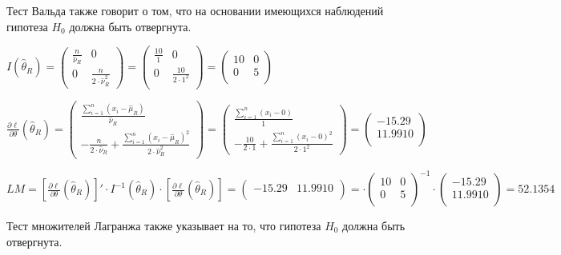\begin{problem}
\begin{sol}
Тест Вальда также говорит о том, что на основании имеющихся наблюдений гипотеза $H_0$ должна быть отвергнута.

$I(\hat{\theta}_{R}) = \begin{pmatrix}
\frac{n}{\hat{\nu}_{R}} & 0 \\
0 & \frac{n}{2 \cdot \hat{\nu}_{R}^2}
\end{pmatrix} = \begin{pmatrix}
\frac{10}{1} & 0 \\
0 & \frac{10}{2\cdot 1^2} \\
\end{pmatrix} = \begin{pmatrix}
10 & 0\\
0 & 5 \\
\end{pmatrix}$

$\frac{\partial \ell}{\partial \theta}(\hat{\theta}_{R}) = \begin{pmatrix}
\frac{\sum_{i=1}^n (x_i - \hat{\mu}_R)}{\hat{\nu}_R}\\
-\frac{n}{2\cdot \hat{\nu}_R} + \frac{\sum_{i=1}^n (x_i - \hat{\mu}_R)^2}{2 \cdot \hat{\nu}_R^2}
\end{pmatrix} = \begin{pmatrix}
\frac{\sum_{i=1}^n (x_i - 0)}{1}\\
-\frac{10}{2\cdot 1} + \frac{\sum_{i=1}^n (x_i - 0)^2}{2 \cdot 1^2}
\end{pmatrix} = \begin{pmatrix}
-15.29 \\
11.9910\\
\end{pmatrix}$

$LM = \left[ \frac{\partial \ell}{\partial \theta}(\hat{\theta}_{R}) \right]' \cdot I^{-1}(\hat{\theta}_{R}) \cdot \left[ \frac{\partial \ell}{\partial \theta}(\hat{\theta}_{R}) \right] = \begin{pmatrix}
-15.29 & 11.9910 \\
\end{pmatrix} = \cdot \begin{pmatrix}
10 & 0\\
0 & 5 \\
\end{pmatrix}^{-1} \cdot \begin{pmatrix}
-15.29 \\
11.9910\\
\end{pmatrix} = 52.1354$

Тест множителей Лагранжа также указывает на то, что гипотеза $H_0$ должна быть отвергнута.
\end{sol}
\end{problem}



